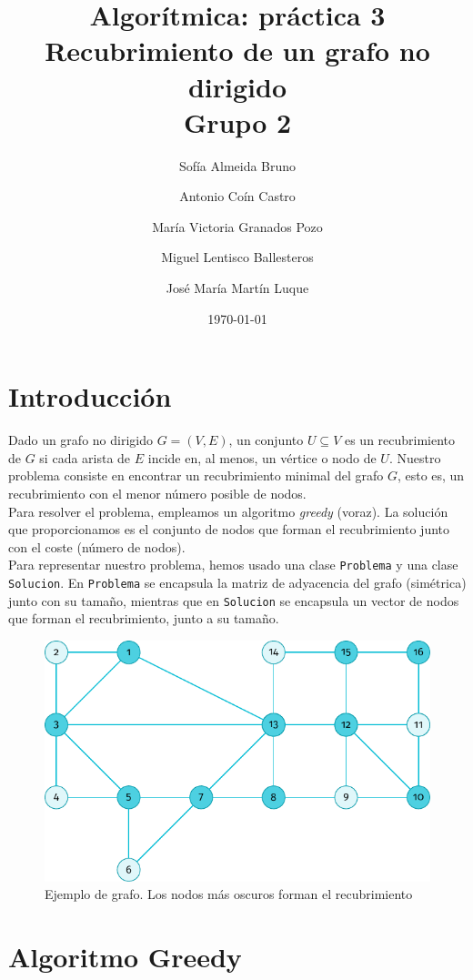 \documentclass[11pt]{article}
\title{Algorítmica: práctica 3 \\ \large Recubrimiento de un grafo no dirigido\\ \vspace{0.2em}Grupo 2}
\author{Sofía Almeida Bruno \and Antonio Coín Castro \and María Victoria Granados Pozo \and Miguel Lentisco Ballesteros \and José María Martín Luque}
\date{\today}
\begin{document}
\maketitle

\newpage

\section*{Introducción}

Dado un grafo no dirigido $G=(V,E)$, un conjunto $U\subseteq V$ es un recubrimiento de $G$ si cada arista de $E$ incide en, al menos, un vértice o nodo de $U$. Nuestro problema consiste en encontrar un recubrimiento minimal del grafo $G$, esto es, un recubrimiento con el menor número posible de nodos. \\

Para resolver el problema, empleamos un algoritmo \textit{greedy} (voraz). La solución que proporcionamos es el conjunto de nodos que forman el recubrimiento junto con el coste (número de nodos). \\

Para representar nuestro problema, hemos usado una clase \verb|Problema| y una clase \verb|Solucion|. En \verb|Problema| se encapsula la matriz de adyacencia del grafo (simétrica) junto con su tamaño, mientras que en \verb|Solucion| se encapsula un vector de nodos que forman el recubrimiento, junto a su tamaño.
\begin{figure}[H]
	\caption{Ejemplo de grafo. Los nodos más oscuros forman el recubrimiento}
	\centering \includegraphics{./img/grafo.pdf}
\end{figure}

\section*{Algoritmo Greedy}
\end{document}
